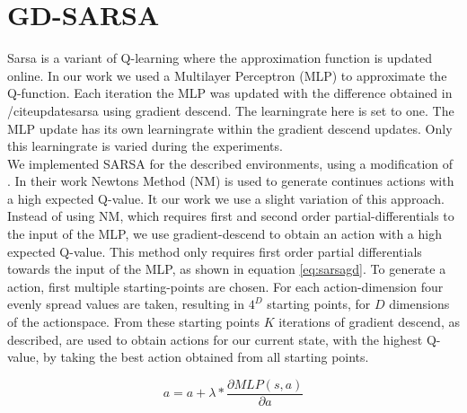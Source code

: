 
\section{GD-SARSA}
Sarsa is a variant of Q-learning where the approximation function is updated online. In our work we used a Multilayer Perceptron (MLP) to approximate the Q-function. Each iteration the MLP was updated with the difference obtained in /cite{updatesarsa} using gradient descend. The learningrate here is set to one. The MLP update has its own learningrate within the gradient descend updates. Only this learningrate is varied during the experiments. \\
\newline
We implemented SARSA for the described environments, using a modification of \cite{https://www.elen.ucl.ac.be/Proceedings/esann/esannpdf/es2014-175.pdf}. In their work Newtons Method (NM) is used to generate continues actions with a high expected Q-value.
It our work we use a slight variation of this approach. Instead of using NM, which requires first and second order partial-differentials to the input of the MLP, we use gradient-descend to obtain an action with a high expected Q-value. This method only requires first order partial differentials towards the input of the MLP, as shown in equation \eqref{eq:sarsagd}.
To generate a action, first multiple starting-points are chosen. For each action-dimension four evenly spread values are taken, resulting in $4 ^ D$ starting points, for $D$ dimensions of the actionspace. From these starting points $K$ iterations of gradient descend, as described, are used to obtain actions for our current state, with the highest Q-value, by taking the best action obtained from all starting points.


\begin{equation}
\label{eq:sarsagd}
a = a + \lambda * \frac{\partial MLP(s,a)}{\partial a}
\end{equation}
